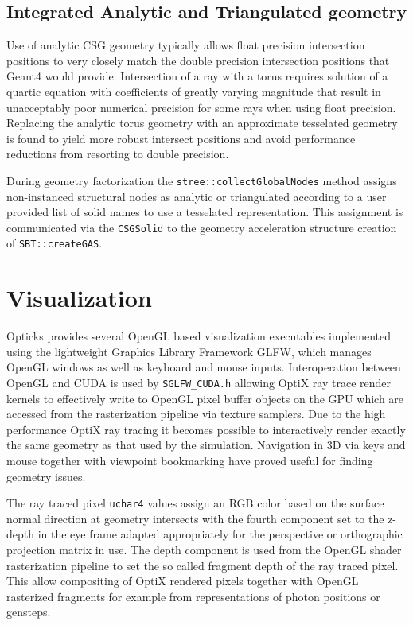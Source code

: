 \documentclass{webofc}
\begin{document}
\subsection{Integrated Analytic and Triangulated geometry}
Use of analytic CSG geometry typically allows float precision intersection 
positions to very closely match the double precision intersection positions 
that Geant4 would provide. 
Intersection of a ray with a torus requires solution of a quartic equation
with coefficients of greatly varying magnitude that result in unacceptably 
poor numerical precision for some rays when using float precision. 
Replacing the analytic torus geometry with an approximate
tesselated geometry is found to yield more robust intersect positions
and avoid performance reductions from resorting to double precision.  

During geometry factorization the {\tt stree::collectGlobalNodes} method
assigns non-instanced structural nodes as analytic or
triangulated according to a user provided list of solid names to use 
a tesselated representation. This assignment is communicated via the {\tt CSGSolid}     
to the geometry acceleration structure creation of {\tt SBT::createGAS}. 
%
%
%
%
\section{Visualization}%
%
Opticks provides several OpenGL based visualization executables 
implemented using the lightweight Graphics Library Framework GLFW,
which manages OpenGL windows as well as keyboard and mouse inputs. 
Interoperation between OpenGL and CUDA is used by {\tt SGLFW\_CUDA.h}
allowing OptiX ray trace render kernels to effectively write to OpenGL 
pixel buffer objects on the GPU which are accessed from the 
rasterization pipeline via texture samplers. 
Due to the high performance OptiX ray tracing it becomes possible 
to interactively render exactly the same geometry as that used 
by the simulation. Navigation in 3D via keys and mouse together 
with viewpoint bookmarking have proved useful for finding geometry issues.      
   
The ray traced pixel {\tt uchar4} values assign an RGB color based on the surface normal direction
at geometry intersects with the fourth component set to the z-depth in the eye frame adapted
appropriately for the perspective or orthographic projection matrix in use. 
The depth component is used from the OpenGL shader rasterization pipeline to set the 
so called fragment depth of the ray traced pixel.   
This allow compositing of OptiX rendered pixels together with OpenGL rasterized 
fragments for example from representations of photon positions or gensteps.
 
\end{document}
